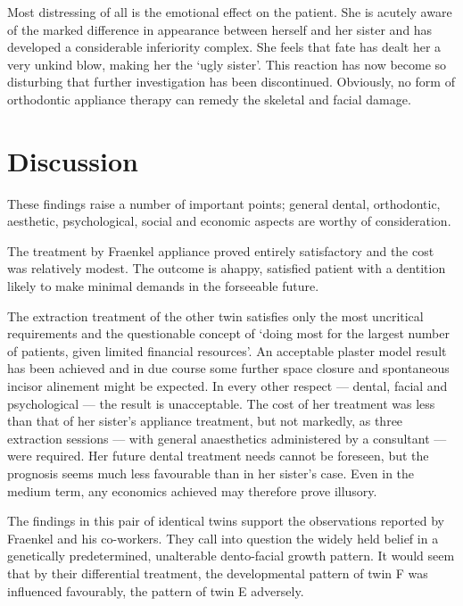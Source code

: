 \documentclass{article}
\begin{document}
Most distressing of all is the emotional effect on the patient.
She is acutely aware of the marked difference in appearance between herself and her sister and has developed a considerable inferiority complex.
She feels that fate has dealt her a very unkind blow, making her the ‘ugly sister’.
This reaction has now become so disturbing that further investigation has been discontinued. Obviously, no form of orthodontic appliance therapy can remedy the skeletal and facial damage.

\section*{Discussion}

These findings raise a number of important points; general dental, orthodontic, aesthetic, psychological, social and economic aspects are worthy of consideration.

The treatment by Fraenkel appliance proved entirely satisfactory and the cost was relatively modest.
The outcome is ahappy, satisfied patient with a dentition likely to make minimal demands in the forseeable future.

The extraction treatment of the other twin satisfies only the most uncritical requirements and the questionable concept of ‘doing most for the largest number of patients, given limited financial resources’.
An acceptable plaster model result has been achieved and in due course some further space closure and spontaneous incisor alinement might be expected.
In every other respect — dental, facial and psychological — the result is unacceptable.
The cost of her treatment was less than that of her sister’s appliance treatment, but not markedly, as three extraction sessions — with general anaesthetics administered by a consultant — were required.
Her future dental treatment needs cannot be foreseen, but the prognosis seems much less favourable than in her sister’s case.
Even in the medium term, any economics achieved may therefore prove illusory.

The findings in this pair of identical twins support the observations reported by Fraenkel and his co-workers.
They call into question the widely held belief in a genetically predetermined, unalterable dento-facial growth pattern. It would seem that by their differential treatment, the developmental pattern of twin F was influenced favourably, the pattern of twin E adversely.
\end{document}
